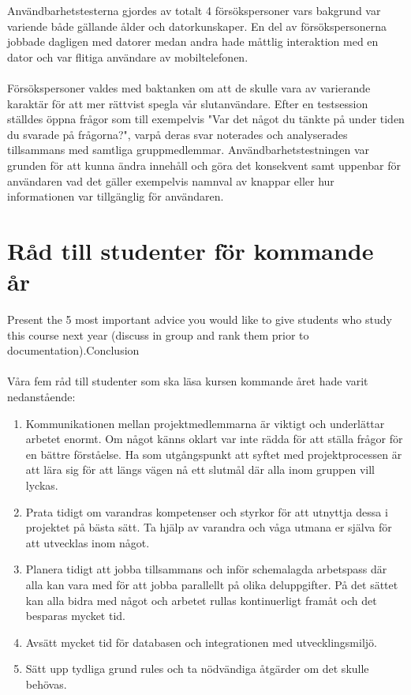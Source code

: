 \documentclass[12pt]{article}
\begin{document}
Användbarhetstesterna gjordes av totalt 4 försökspersoner vars bakgrund var variende både gällande ålder och datorkunskaper. En del av försökspersonerna jobbade dagligen med datorer medan andra hade måttlig interaktion med en dator och var flitiga användare av mobiltelefonen. \\\\
Försökspersoner valdes med baktanken om att de skulle vara av varierande karaktär för att mer rättvist spegla vår slutanvändare. Efter en testsession ställdes öppna frågor som till exempelvis "Var det något du tänkte på under tiden du svarade på frågorna?", varpå deras svar noterades och analyserades tillsammans med samtliga gruppmedlemmar. Användbarhetstestningen var grunden för att kunna ändra innehåll och göra det konsekvent samt uppenbar för användaren vad det gäller exempelvis namnval av knappar eller hur informationen var tillgänglig för användaren.

\section{Råd till studenter för kommande år}
Present the 5 most important advice you would like to give students who study this course next year (discuss in group and rank them prior to documentation).Conclusion\\\\
Våra fem råd till studenter som ska läsa kursen kommande året hade varit nedanstående:
\begin{enumerate}

\item  Kommunikationen mellan projektmedlemmarna är viktigt och underlättar arbetet enormt. Om något känns oklart var inte rädda för att ställa frågor för en bättre förståelse. Ha som utgångspunkt att syftet med projektprocessen är att lära sig för att längs vägen nå ett slutmål där alla inom gruppen vill lyckas.
\item Prata tidigt om varandras kompetenser och styrkor för att utnyttja dessa i projektet på bästa sätt. Ta hjälp av varandra och våga utmana er själva för att utvecklas inom något. 
\item  Planera tidigt att jobba tillsammans och inför schemalagda arbetspass där alla kan vara med för att jobba parallellt på olika deluppgifter. På det sättet kan alla bidra med något och arbetet rullas kontinuerligt framåt och det besparas mycket tid. 
\item  Avsätt mycket tid för databasen och integrationen med utvecklingsmiljö. 
\item  Sätt upp tydliga grund rules och ta nödvändiga åtgärder om det skulle behövas.        
\end{enumerate}
\end{document}
